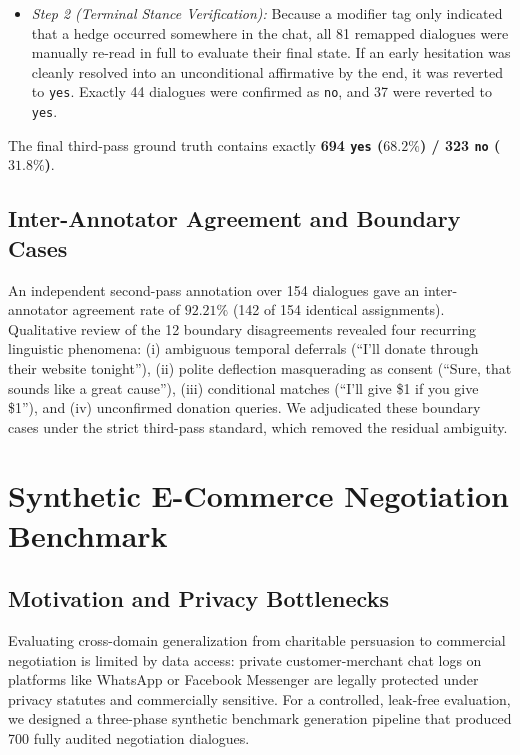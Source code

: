 \begin{enumerate}
\begin{itemize}
      \item \textit{Step 2 (Terminal Stance Verification):} Because a modifier tag only indicated that a hedge occurred somewhere in the chat, all 81 remapped dialogues were manually re-read in full to evaluate their final state. If an early hesitation was cleanly resolved into an unconditional affirmative by the end, it was reverted to \texttt{yes}. Exactly 44 dialogues were confirmed as \texttt{no}, and 37 were reverted to \texttt{yes}.
    \end{itemize}
    The final third-pass ground truth contains exactly \textbf{694 \texttt{yes} ($68.2\%$) / 323 \texttt{no} ($31.8\%$)}.
\end{enumerate}

\subsection{Inter-Annotator Agreement and Boundary Cases}
An independent second-pass annotation over 154 dialogues gave an inter-annotator agreement rate of \textbf{$92.21\%$} (142 of 154 identical assignments). Qualitative review of the 12 boundary disagreements revealed four recurring linguistic phenomena: (i) ambiguous temporal deferrals (``I'll donate through their website tonight''), (ii) polite deflection masquerading as consent (``Sure, that sounds like a great cause''), (iii) conditional matches (``I'll give \$1 if you give \$1''), and (iv) unconfirmed donation queries. We adjudicated these boundary cases under the strict third-pass standard, which removed the residual ambiguity.

\section{Synthetic E-Commerce Negotiation Benchmark}
\label{sec:synthetic-benchmark}

\subsection{Motivation and Privacy Bottlenecks}
Evaluating cross-domain generalization from charitable persuasion to commercial negotiation is limited by data access: private customer-merchant chat logs on platforms like WhatsApp or Facebook Messenger are legally protected under privacy statutes and commercially sensitive. For a controlled, leak-free evaluation, we designed a three-phase synthetic benchmark generation pipeline that produced 700 fully audited negotiation dialogues.

